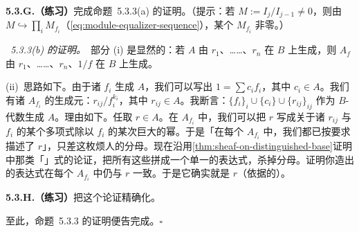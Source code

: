 \textbf{5.3.G.（练习）}\quad 完成命题~5.3.3(a) 的证明。（提示：若 $M:=I_j/I_{j-1}\neq0$，则由 $M\hookrightarrow\prod_i M_{f_i}$（\eqref{eq:module-equalizer-sequence}），某个 $M_{f_i}$ 非零。）

\emph{\trhProposition{}~5.3.3(b) 的证明。}\ 部分 (i) 是显然的：若 $A$ 由 $r_1$、……、$r_n$ 在 $B$ 上生成，则 $A_f$ 由 $r_1$、……、$r_n$、$1/f$ 在 $B$ 上生成。

(ii)~思路如下。由于诸 $f_i$ 生成 $A$，我们可以写出 $1=\sum c_if_i$，其中 $c_i\in A$。我们有诸 $A_{f_i}$ 的生成元：$r_{ij}/f_i^{k_i}$，其中 $r_{ij}\in A$。我断言：$\{f_i\}_i\cup\{c_i\}\cup\{r_{ij}\}_{ij}$ 作为 $B$-代数生成 $A$。理由如下。任取 $r\in A$。在 $A_{f_i}$ 中，我们可以把 $r$ 写成关于诸 $r_{ij}$ 与 $f_i$ 的某个多项式除以 $f_i$ 的某次巨大的幂。于是「在每个 $A_{f_i}$ 中，我们都已按要求描述了 $r$」，只差这枚烦人的分母。现在沿用\cref{thm:sheaf-on-distinguished-base}证明中那类「\trPartitionOfUnity{}」式的论证，把所有这些拼成一个单一的表达式，杀掉分母。证明你造出的表达式在每个 $A_{f_i}$ 中仍与 $r$ 一致。于是它确实就是 $r$（依据\trStructureSheaf{}的\trIdentityAxiom）。

\textbf{5.3.H.（练习）}\quad 把这个论证精确化。

至此，命题~5.3.3 的证明便告完成。\hfill$\square$
